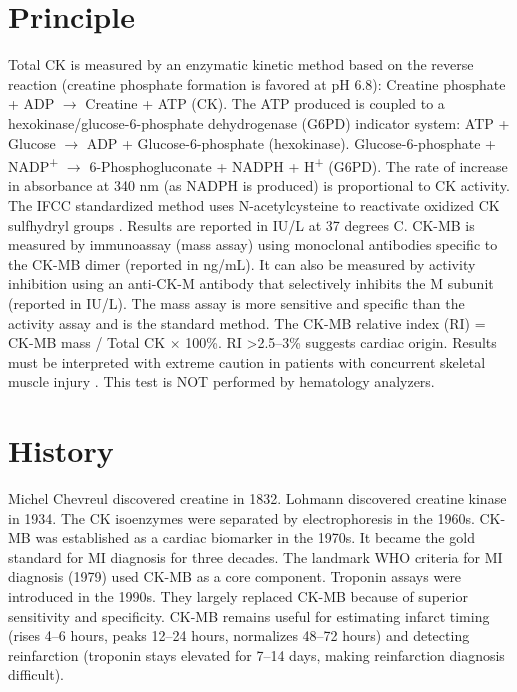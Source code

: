 \section*{Principle}
Total CK is measured by an enzymatic kinetic method based on the reverse reaction (creatine phosphate formation is favored at pH 6.8): Creatine phosphate + ADP $\rightarrow$ Creatine + ATP (CK). The ATP produced is coupled to a hexokinase/glucose-6-phosphate dehydrogenase (G6PD) indicator system: ATP + Glucose $\rightarrow$ ADP + Glucose-6-phosphate (hexokinase). Glucose-6-phosphate + NADP\textsuperscript{+} $\rightarrow$ 6-Phosphogluconate + NADPH + H\textsuperscript{+} (G6PD). The rate of increase in absorbance at 340 nm (as NADPH is produced) is proportional to CK activity. The IFCC standardized method uses N-acetylcysteine to reactivate oxidized CK sulfhydryl groups \cite{tietz2023textbook}. Results are reported in IU/L at 37 degrees C. CK-MB is measured by immunoassay (mass assay) using monoclonal antibodies specific to the CK-MB dimer (reported in ng/mL). It can also be measured by activity inhibition using an anti-CK-M antibody that selectively inhibits the M subunit (reported in IU/L). The mass assay is more sensitive and specific than the activity assay and is the standard method. The CK-MB relative index (RI) = CK-MB mass / Total CK $\times$ 100\%. RI >2.5--3\% suggests cardiac origin. Results must be interpreted with extreme caution in patients with concurrent skeletal muscle injury \cite{morrow2007national}. This test is NOT performed by hematology analyzers.

\section*{History}
Michel Chevreul discovered creatine in 1832. Lohmann discovered creatine kinase in 1934. The CK isoenzymes were separated by electrophoresis in the 1960s. CK-MB was established as a cardiac biomarker in the 1970s. It became the gold standard for MI diagnosis for three decades. The landmark WHO criteria for MI diagnosis (1979) used CK-MB as a core component. Troponin assays were introduced in the 1990s. They largely replaced CK-MB because of superior sensitivity and specificity. CK-MB remains useful for estimating infarct timing (rises 4--6 hours, peaks 12--24 hours, normalizes 48--72 hours) and detecting reinfarction (troponin stays elevated for 7--14 days, making reinfarction diagnosis difficult).

